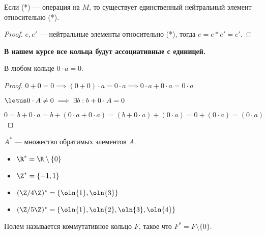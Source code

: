 \begin{notice}
    Если (*) --- операция на $M$, то существует единственный нейтральный элемент относительно (*).
\end{notice}

\begin{proof}
    $e, e'$ --- нейтральные элементы относительно (*), тогда $e = e * e' = e'$.
\end{proof}

\begin{theorem-non}
    {\textbf{В нашем курсе все кольца будут ассоциативные с единицей.}}
\end{theorem-non}

\begin{lemma}
    В любом кольце $0 \cdot a = 0$.
\end{lemma}
\begin{proof}

    $0 + 0 = 0 \implies (0 + 0) \cdot a = 0 \cdot a \implies 0 \cdot a + 0 \cdot a = 0 \cdot a$

    $\letus 0 \cdot A \neq 0 \implies \exists b: b + 0 \cdot A = 0$
    
    $0 = b + 0 \cdot a = b + (0 \cdot a + 0 \cdot a) = (b + 0 \cdot a) + (0 \cdot a) = 0 + (0 \cdot a) = (0 \cdot a)$
\end{proof}

\begin{defn}
    $A^*$ --- множество обратимых элементов $A$.
\end{defn}

\begin{examples}
    \begin{itemize}
        \item $\R^* = \R \setminus \{0\}$
        \item $\Z^* = \{-1, 1\}$
        \item $(\Z/4\Z)^* = \{\oln{1}, \oln{3}\}$
        \item $(\Z/5\Z)^* = \{\oln{1}, \oln{2}, \oln{3}, \oln{4}\}$
    \end{itemize}
\end{examples}

\begin{defn}
    Полем называется коммутативное кольцо $F$, такое что $F^* = F \setminus \{0\}$.
\end{defn}
